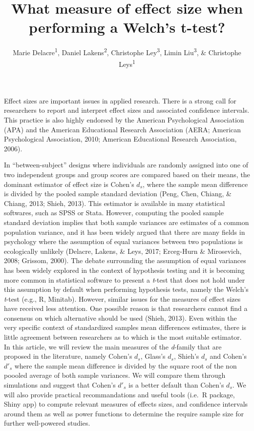 \documentclass[
  man,floatsintext]{apa6}
\affiliation{
\vspace{0.5cm}
\textsuperscript{1} Université Libre de Bruxelles, Service of Analysis of the Data (SAD), Bruxelles, Belgium\\\textsuperscript{2} Eindhoven University of Technology, Human Technology Interaction Group, Eindhoven, the Netherlands\\\textsuperscript{3} Universiteit Gent, Department of Applied Mathematics, Computer Science and Statistics,4 Gent, Belgium}
\title{What measure of effect size when performing a Welch's t-test?}
\author{Marie Delacre\textsuperscript{1}, Daniel Lakens\textsuperscript{2}, Christophe Ley\textsuperscript{3}, Limin Liu\textsuperscript{3}, \& Christophe Leys\textsuperscript{1}}
\date{}
\begin{document}
\maketitle

Effect sizes are important issues in applied research. There is a strong call for researchers to report and interpret effect sizes and associated confidence intervals. This practice is also highly endorsed by the American Psychological Association (APA) and the American Educational Research Association (AERA; American Psychological Association, 2010; American Educational Research Association, 2006).

In \enquote{between-subject} designs where individuals are randomly assigned into one of two independent groups and group scores are compared based on their means, the dominant estimator of effect size is Cohen's \(d_s\), where the sample mean difference is divided by the pooled sample standard deviation (Peng, Chen, Chiang, \& Chiang, 2013; Shieh, 2013). This estimator is available in many statistical softwares, such as SPSS or Stata. However, computing the pooled sample standard deviation implies that both sample variances are estimates of a common population variance, and it has been widely argued that there are many fields in psychology where the assumption of equal variances between two populations is ecologically unlikely (Delacre, Lakens, \& Leys, 2017; Erceg-Hurn \& Mirosevich, 2008; Grissom, 2000). The debate surrounding the assumption of equal variances has been widely explored in the context of hypothesis testing and it is becoming more common in statistical software to present a \emph{t}-test that does not hold under this assumption by default when performing hypothesis tests, namely the Welch's \emph{t}-test (e.g., R, Minitab). However, similar issues for the measures of effect sizes have received less attention. One possible reason is that researchers cannot find a consensus on which alternative should be used (Shieh, 2013). Even within the very specific context of standardized samples mean differences estimates, there is little agreement between researchers as to which is the most suitable estimator. In this article, we will review the main measures of the \emph{d}-family that are proposed in the literature, namely Cohen's \(d_s\), Glass's \(d_s\), Shieh's \(d_s\) and Cohen's \(d'_s\) where the sample mean difference is divided by the square root of the non poooled average of both sample variances. We will compare them through simulations and suggest that Cohen's \(d'_s\) is a better default than Cohen's \(d_s\). We will also provide practical recommandations and useful tools (i.e.~R package, Shiny app) to compute relevant measures of effects sizes, and confidence intervals around them as well as power functions to determine the require sample size for further well-powered studies.
\end{document}

